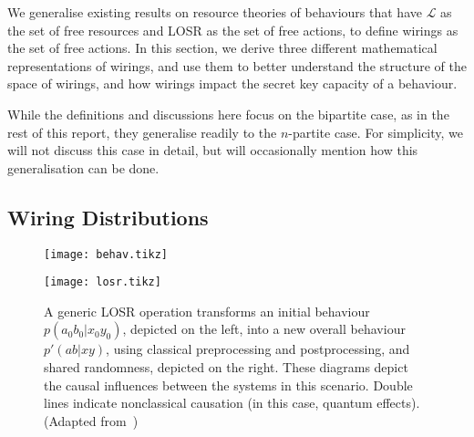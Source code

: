 \documentclass[10pt, a4paper]{article}
\numberwithin{equation}{section} %
\theoremstyle{definition}
\theoremstyle{plain}
\newcommand{\?}{\mathrel{?}} %
\newcommand{\Ls}{\mathcal{L}}
\begin{document}
              We generalise existing results on resource theories of behaviours that have \(\Ls\) as the set of free resources and LOSR as the set of free actions, to define wirings as the set of free actions. In this section, we derive three different mathematical representations of wirings, and use them to better understand the structure of the space of wirings, and how wirings impact the secret key capacity of a behaviour.

              While the definitions and discussions here focus on the bipartite case, as in the rest of this report, they generalise readily to the \(n\)-partite case. For simplicity, we will not discuss this case in detail, but will occasionally mention how this generalisation can be done.

              \subsection{Wiring Distributions}\label{sec:locwir_dist}

              \begin{figure}
                \centering
                \begin{minipage}{0.3\linewidth}
                  \centering
                  \texttt{[image: behav.tikz]}
                \end{minipage}
                \begin{minipage}{0.6\linewidth}
                  \centering
                  \texttt{[image: losr.tikz]}
                \end{minipage}
                \caption[Causal influences in an LOSR operation on a quantum behaviour.]{\label{fig:losr} A generic LOSR operation transforms an initial behaviour \(p(a_0 b_0|x_0 y_0)\), depicted on the left, into a new overall behaviour \(p'(ab|xy)\), using classical preprocessing and postprocessing, and shared randomness, depicted on the right. These diagrams depict the causal influences between the systems in this scenario. Double lines indicate nonclassical causation (in this case, quantum effects). (Adapted from~\cite{NonclassicalCausation})}
              \end{figure}
\end{document}

